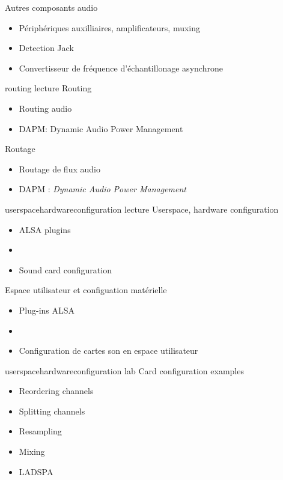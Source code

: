 {Autres composants audio}
{
  \begin{itemize}
  \item Périphériques auxilliaires, amplificateurs, muxing
  \item Detection Jack
  \item Convertisseur de fréquence d'échantillonage asynchrone
  \end{itemize}
  \vspace{0.5em}
}
{routing}
{lecture}
{Routing}
{
  \begin{itemize}
  \item Routing audio
  \item DAPM: Dynamic Audio Power Management
  \end{itemize}
  \vspace{0.5em}
}
{Routage}
{
  \begin{itemize}
  \item Routage de flux audio
  \item DAPM : {\em Dynamic Audio Power Management}
  \end{itemize}
  \vspace{0.5em}
}
{userspacehardwareconfiguration}
{lecture}
{Userspace, hardware configuration}
{
  \begin{itemize}
  \item ALSA plugins
  \item {}
  \item Sound card configuration
  \end{itemize}
  \vspace{0.5em}
}
{Espace utilisateur et configuation matérielle}
{
  \begin{itemize}
  \item Plug-ins ALSA
  \item {}
  \item Configuration de cartes son en espace utilisateur
  \end{itemize}
  \vspace{0.5em}
}
{userspacehardwareconfiguration}
{lab}
{Card configuration examples}
{
  \begin{itemize}
  \item Reordering channels
  \item Splitting channels
  \item Resampling
  \item Mixing
  \item LADSPA
  \end{itemize}
  \vspace{0.5em}
}
